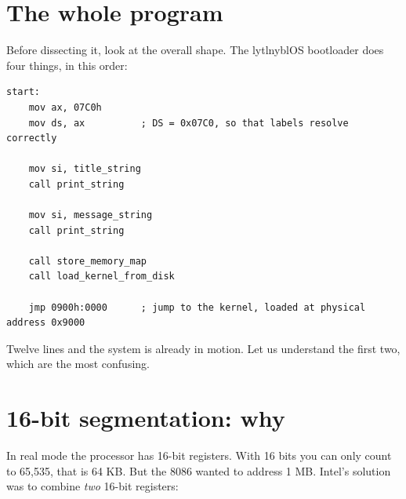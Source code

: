 \section{The whole program}

Before dissecting it, look at the overall shape. The lytlnyblOS bootloader does four things, in
this order:

\begin{center}
\end{center}

\begin{lstlisting}[style=asm]
start:
    mov ax, 07C0h
    mov ds, ax          ; DS = 0x07C0, so that labels resolve correctly

    mov si, title_string
    call print_string

    mov si, message_string
    call print_string

    call store_memory_map
    call load_kernel_from_disk

    jmp 0900h:0000      ; jump to the kernel, loaded at physical address 0x9000
\end{lstlisting}

Twelve lines and the system is already in motion. Let us understand the first two, which are the
most confusing.

\section{16-bit segmentation: why }

In real mode the processor has 16-bit registers. With 16 bits you can only count to 65,535, that
is 64 KB. But the 8086 wanted to address 1 MB. Intel's solution was to combine \emph{two} 16-bit
registers:

